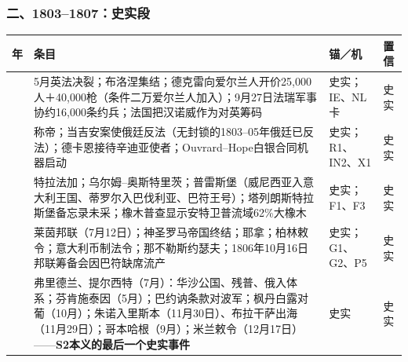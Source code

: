 \documentclass[
  10pt,
  a4paper,
]{article}
\newcounter{none} %
\begin{document}
\subsubsection{二、1803--1807：史实段}\label{ux4e8c18031807ux53f2ux5b9eux6bb5}

{\def\LTcaptype{none} %
\begin{longtable}[]{@{}
  >{\raggedright\arraybackslash}p{}
  >{\raggedright\arraybackslash}p{}
  >{\raggedright\arraybackslash}p{}
  >{\raggedright\arraybackslash}p{}@{}}
\toprule\noalign{}
\begin{minipage}[b]{\linewidth}\raggedright
年
\end{minipage} & \begin{minipage}[b]{\linewidth}\raggedright
条目
\end{minipage} & \begin{minipage}[b]{\linewidth}\raggedright
锚／机
\end{minipage} & \begin{minipage}[b]{\linewidth}\raggedright
置信
\end{minipage} \\
\midrule\noalign{}
\endhead
\bottomrule\noalign{}
\endlastfoot
1803 &
5月英法决裂；布洛涅集结；德克雷向爱尔兰人开价25,000人＋40,000枪（条件二万爱尔兰人加入）；9月27日法瑞军事协约16,000条约兵；法国把汉诺威作为对英筹码
& 史实；IE、NL卡 & 史实 \\
1804 &
称帝；当吉安案使俄廷反法（无封锁的1803--05年俄廷已反法）；德卡恩接待辛迪亚使者；Ouvrard--Hope白银合同机器启动
& 史实；R1、IN2、X1 & 史实 \\
1805 &
特拉法加；乌尔姆--奥斯特里茨；普雷斯堡（威尼西亚入意大利王国、蒂罗尔入巴伐利亚、巴符王号）；塔列朗斯特拉斯堡备忘录未采；橡木普查显示安特卫普流域62\%大橡木
& 史实；F1、F3 & 史实 \\
1806 &
莱茵邦联（7月12日）；神圣罗马帝国终结；耶拿；柏林敕令；意大利币制法令；那不勒斯约瑟夫；1806年10月16日邦联筹备会因巴符缺席流产
& 史实；G1、G2、P5 & 史实 \\
1807 &
弗里德兰、提尔西特（7月）：华沙公国、残普、俄入体系；芬肯施泰因（5月）；巴约讷条款对波军；枫丹白露对葡（10月）；朱诺入里斯本（11月30日）、布拉干萨出海（11月29日）；哥本哈根（9月）；米兰敕令（12月17日）------\textbf{S2本义的最后一个史实事件}
& 史实 & 史实 \\
\end{longtable}
}
\end{document}
